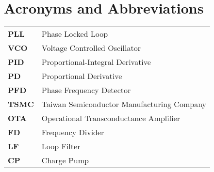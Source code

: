\chapter*{Acronyms and Abbreviations}
\vspace{5mm}
\begin{tabular}{ll}
\textbf{PLL}  & Phase Locked Loop \\
\textbf{VCO}  & Voltage Controlled Oscillator \\
\textbf{PID}  & Proportional-Integral Derivative \\
\textbf{PD}   & Proportional Derivative \\
\textbf{PFD}  & Phase Frequency Detector \\
\textbf{TSMC} & Taiwan Semiconductor Manufacturing Company \\
\textbf{OTA}  & Operational Transconductance Amplifier \\
\textbf{FD}   & Frequency Divider \\
\textbf{LF}   & Loop Filter \\
\textbf{CP}   & Charge Pump \\
\end{tabular}
